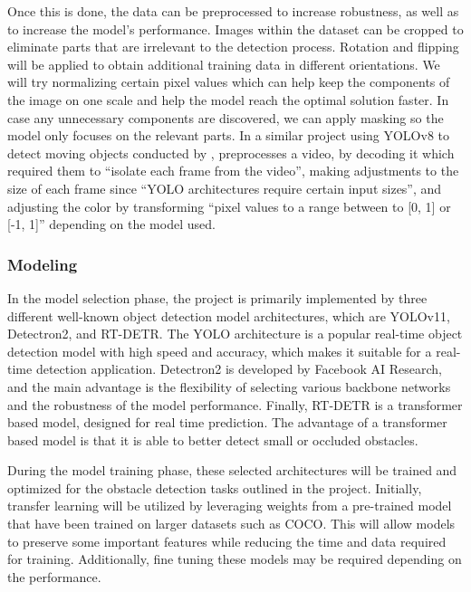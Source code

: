 \documentclass[stu,12pt,floatsintext]{apa7}
\begin{document}
Once this is done, the data can be preprocessed to increase robustness, as well as to increase the model's performance.
Images within the dataset can be cropped to eliminate parts that are irrelevant to the detection process. Rotation and flipping will be applied to obtain additional training data in different orientations. We will try normalizing certain pixel values which can help keep the components of the image on one scale and help the model reach the optimal solution faster. In case any unnecessary components are discovered, we can apply masking so the model only focuses on the relevant parts. In a similar project using YOLOv8 to detect moving objects conducted by \textcite{safaldin_improved_2024}, preprocesses a video, by decoding it which required them to ``isolate each frame from the video'', making adjustments to the size of each frame since ``YOLO architectures require certain input sizes'', and adjusting the color by transforming ``pixel values to a range between to [0, 1] or [-1, 1]'' depending on the model used.


\subsubsection{Modeling}

In the model selection phase, the project is primarily implemented by three different well-known object detection model architectures, which are YOLOv11, Detectron2, and RT-DETR. The YOLO architecture is a popular real-time object detection model with high speed and accuracy, which makes it suitable for a real-time detection application. Detectron2 is developed by Facebook AI Research, and the main advantage is the flexibility of selecting various backbone networks and the robustness of the model performance. Finally, RT-DETR is a transformer based model, designed for real time prediction. The advantage of a transformer based model is that it is able to better detect small or occluded obstacles.

During the model training phase, these selected architectures will be trained and optimized for the obstacle detection tasks outlined in the project. Initially, transfer learning will be utilized by leveraging weights from a pre-trained model that have been trained on larger datasets such as COCO. This will allow models to preserve some important features while reducing the time and data required for training. Additionally, fine tuning these models may be required depending on the performance.
\end{document}

